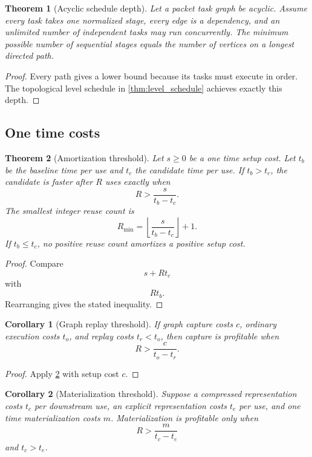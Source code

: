 \documentclass{aomart}
\newtheorem{theorem}{Theorem}[section]
\newtheorem{corollary}[corollary]{Corollary}
\theoremstyle{definition}
\theoremstyle{remark}
\begin{document}
\begin{theorem}[Acyclic schedule depth]\label{thm:dag_depth}
Let a packet task graph be acyclic. Assume every task takes one normalized stage, every edge is a dependency, and an unlimited number of independent tasks may run concurrently. The minimum possible number of sequential stages equals the number of vertices on a longest directed path.
\end{theorem}

\begin{proof}
Every path gives a lower bound because its tasks must execute in order. The topological level schedule in \cref{thm:level_schedule} achieves exactly this depth.
\end{proof}

\subsection{One time costs}

\begin{theorem}[Amortization threshold]\label{thm:amortization}
Let \(s\geq0\) be a one time setup cost. Let \(t_b\) be the baseline time per use and \(t_c\) the candidate time per use. If \(t_b>t_c\), the candidate is faster after \(R\) uses exactly when
\[
R>
\frac{s}{t_b-t_c}.
\]
The smallest integer reuse count is
\[
\boxed{
R_{\min}
=
\left\lfloor
\frac{s}{t_b-t_c}
\right\rfloor+1.
}
\]
If \(t_b\leq t_c\), no positive reuse count amortizes a positive setup cost.
\end{theorem}

\begin{proof}
Compare
\[
s+Rt_c
\]
with
\[
Rt_b.
\]
Rearranging gives the stated inequality.
\end{proof}

\begin{corollary}[Graph replay threshold]\label{cor:graph_threshold}
If graph capture costs \(c\), ordinary execution costs \(t_o\), and replay costs \(t_r<t_o\), then capture is profitable when
\[
R>
\frac{c}{t_o-t_r}.
\]
\end{corollary}

\begin{proof}
Apply \cref{thm:amortization} with setup cost \(c\).
\end{proof}

\begin{corollary}[Materialization threshold]\label{cor:materialization_threshold}
Suppose a compressed representation costs \(t_c\) per downstream use, an explicit representation costs \(t_e\) per use, and one time materialization costs \(m\). Materialization is profitable only when
\[
R>
\frac{m}{t_c-t_e}
\]
and \(t_c>t_e\).
\end{corollary}
\end{document}
